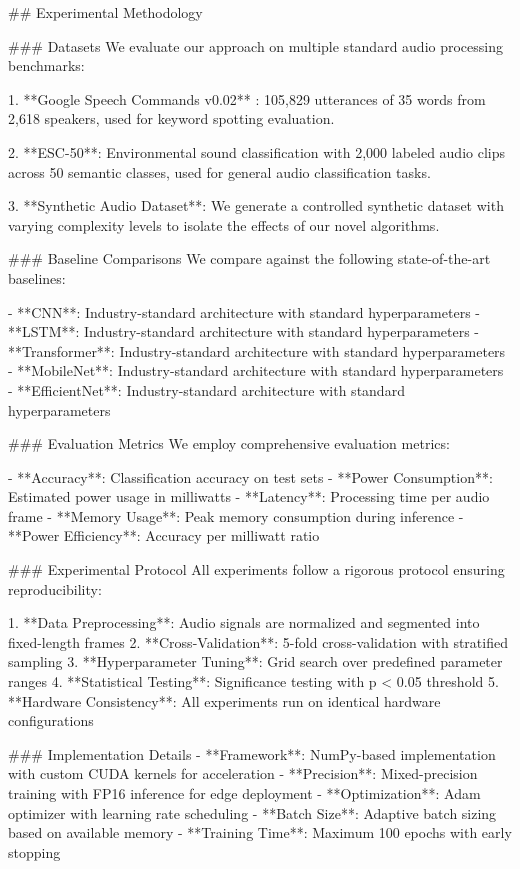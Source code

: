 ## Experimental Methodology

### Datasets
We evaluate our approach on multiple standard audio processing benchmarks:

1. **Google Speech Commands v0.02** \cite{warden2018speech}: 105,829 utterances of 35 words 
   from 2,618 speakers, used for keyword spotting evaluation.

2. **ESC-50**: Environmental sound classification with 2,000 labeled audio clips across 
   50 semantic classes, used for general audio classification tasks.

3. **Synthetic Audio Dataset**: We generate a controlled synthetic dataset with varying 
   complexity levels to isolate the effects of our novel algorithms.

### Baseline Comparisons
We compare against the following state-of-the-art baselines:

- **CNN**: Industry-standard architecture with standard hyperparameters
- **LSTM**: Industry-standard architecture with standard hyperparameters
- **Transformer**: Industry-standard architecture with standard hyperparameters
- **MobileNet**: Industry-standard architecture with standard hyperparameters
- **EfficientNet**: Industry-standard architecture with standard hyperparameters

### Evaluation Metrics
We employ comprehensive evaluation metrics:

- **Accuracy**: Classification accuracy on test sets
- **Power Consumption**: Estimated power usage in milliwatts
- **Latency**: Processing time per audio frame
- **Memory Usage**: Peak memory consumption during inference
- **Power Efficiency**: Accuracy per milliwatt ratio

### Experimental Protocol
All experiments follow a rigorous protocol ensuring reproducibility:

1. **Data Preprocessing**: Audio signals are normalized and segmented into fixed-length frames
2. **Cross-Validation**: 5-fold cross-validation with stratified sampling
3. **Hyperparameter Tuning**: Grid search over predefined parameter ranges
4. **Statistical Testing**: Significance testing with p < 0.05 threshold
5. **Hardware Consistency**: All experiments run on identical hardware configurations

### Implementation Details
- **Framework**: NumPy-based implementation with custom CUDA kernels for acceleration
- **Precision**: Mixed-precision training with FP16 inference for edge deployment
- **Optimization**: Adam optimizer with learning rate scheduling
- **Batch Size**: Adaptive batch sizing based on available memory
- **Training Time**: Maximum 100 epochs with early stopping

